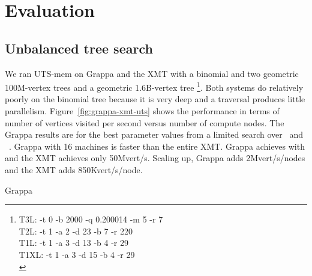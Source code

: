 \section{Evaluation} \label{sec:evaluation}

\subsection{Unbalanced tree search}

We ran UTS-mem on Grappa and the XMT with a binomial and two geometric
100M-vertex trees and a geometric 1.6B-vertex tree
\footnote{T3L: -t 0 -b 2000 -q 0.200014 -m 5 -r 7\\
          T2L: -t 1 -a 2 -d 23 -b 7 -r 220\\
          T1L: -t 1 -a 3 -d 13 -b 4 -r 29\\
          T1XL: -t 1 -a 3 -d 15 -b 4 -r 29\\}.
Both systems do relatively poorly on the binomial tree because it is very deep and a
traversal produces little parallelism. Figure~\ref{fig:grappa-xmt-uts}
shows the performance in terms of number of vertices visited per
second versus number of compute nodes. The Grappa results are for the
best parameter values from a limited search over \flushtimeout~and
\asyncforthr~.
Grappa with 16 machines is faster than the entire XMT. Grappa achieves  with  and the
XMT achieves only 50Mvert/s. Scaling up, Grappa adds 2Mvert/s/nodes
and the XMT adds 850Kvert/s/node.

Grappa




